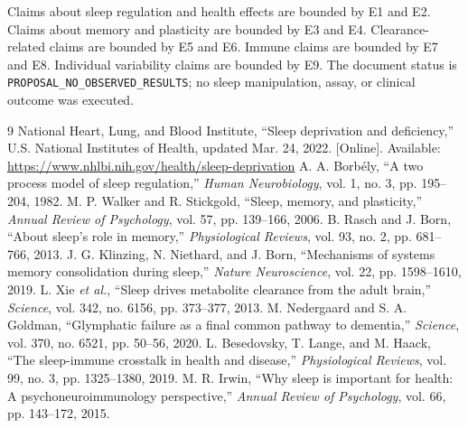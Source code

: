 \documentclass[conference]{IEEEtran}
\begin{document}
Claims about sleep regulation and health effects are bounded by E1 and E2. Claims about memory and plasticity are bounded by E3 and E4. Clearance-related claims are bounded by E5 and E6. Immune claims are bounded by E7 and E8. Individual variability claims are bounded by E9. The document status is \texttt{PROPOSAL\_NO\_OBSERVED\_RESULTS}; no sleep manipulation, assay, or clinical outcome was executed.

\begin{thebibliography}{9}
 National Heart, Lung, and Blood Institute, ``Sleep deprivation and deficiency,'' U.S. National Institutes of Health, updated Mar. 24, 2022. [Online]. Available: \url{https://www.nhlbi.nih.gov/health/sleep-deprivation}
 A. A. Borb\'ely, ``A two process model of sleep regulation,'' \textit{Human Neurobiology}, vol. 1, no. 3, pp. 195--204, 1982.
 M. P. Walker and R. Stickgold, ``Sleep, memory, and plasticity,'' \textit{Annual Review of Psychology}, vol. 57, pp. 139--166, 2006.
 B. Rasch and J. Born, ``About sleep's role in memory,'' \textit{Physiological Reviews}, vol. 93, no. 2, pp. 681--766, 2013.
 J. G. Klinzing, N. Niethard, and J. Born, ``Mechanisms of systems memory consolidation during sleep,'' \textit{Nature Neuroscience}, vol. 22, pp. 1598--1610, 2019.
 L. Xie \textit{et al.}, ``Sleep drives metabolite clearance from the adult brain,'' \textit{Science}, vol. 342, no. 6156, pp. 373--377, 2013.
 M. Nedergaard and S. A. Goldman, ``Glymphatic failure as a final common pathway to dementia,'' \textit{Science}, vol. 370, no. 6521, pp. 50--56, 2020.
 L. Besedovsky, T. Lange, and M. Haack, ``The sleep-immune crosstalk in health and disease,'' \textit{Physiological Reviews}, vol. 99, no. 3, pp. 1325--1380, 2019.
 M. R. Irwin, ``Why sleep is important for health: A psychoneuroimmunology perspective,'' \textit{Annual Review of Psychology}, vol. 66, pp. 143--172, 2015.
\end{thebibliography}
\end{document}
